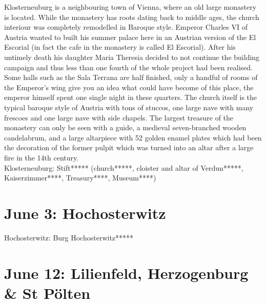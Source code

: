 Klosterneuburg is a neighbouring town of Vienna, where an old large monastery is located. While the monastery has roots dating back to middle ages, the church interiour was completely remodelled in Baroque style. Emperor Charles VI of Austria wanted to built his summer palace here in an Austrian version of the El Escorial (in fact the cafe in the monastery is called El Escorial). After his untimely death his daughter Maria Theresia decided to not continue the building campaign and thus less than one fourth of the whole project had been realised. Some halls such as the Sala Terrana are half finished, only a handful of rooms of the Emperor's wing give you an idea what could have become of this place, the emperor himself spent one single night in these quarters. The church itself is the typical baroque style of Austria with tons of stuccos, one large nave with many frescoes and one large nave with side chapels. The largest treasure of the monastery can only be seen with a guide, a medieval seven-branched wooden candelabrum, and a large altarpiece with 52 golden enamel plates which had been the decoration of the former pulpit which was turned into an altar after a large fire in the 14th century.\\

Klosterneuburg: Stift***** (church*****, cloister and altar of Verdun*****, Kaiserzimmer****, Treasury****, Museum****)


\section{June 3: Hochosterwitz}
\label{2021Hochosterwitz}

Hochosterwitz: Burg Hochosterwitz*****

\section{June 12: Lilienfeld, Herzogenburg \& St P\"olten}
\label{2021Lilienfeld}

